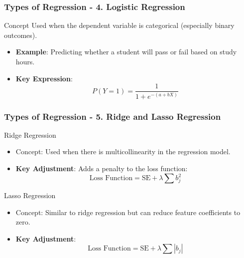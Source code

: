 \documentclass[aspectratio=169]{beamer}
\begin{document}
\begin{frame}[fragile]
    \frametitle{Types of Regression - 4. Logistic Regression}
    \begin{block}{Concept}
        Used when the dependent variable is categorical (especially binary outcomes).
    \end{block}
    \begin{itemize}
        \item \textbf{Example}: Predicting whether a student will pass or fail based on study hours.
        \item \textbf{Key Expression}:
        \begin{equation}
            P(Y=1) = \frac{1}{1 + e^{-(a + bX)}}
        \end{equation}
    \end{itemize}
\end{frame}

\begin{frame}[fragile]
    \frametitle{Types of Regression - 5. Ridge and Lasso Regression}
    \begin{block}{Ridge Regression}
        \begin{itemize}
            \item Concept: Used when there is multicollinearity in the regression model.
            \item \textbf{Key Adjustment}: Adds a penalty to the loss function: 
            \begin{equation}
                \text{Loss Function} = \text{SE} + \lambda \sum b_j^2
            \end{equation}
        \end{itemize}
    \end{block}
    \begin{block}{Lasso Regression}
        \begin{itemize}
            \item Concept: Similar to ridge regression but can reduce feature coefficients to zero.
            \item \textbf{Key Adjustment}: 
            \begin{equation}
                \text{Loss Function} = \text{SE} + \lambda \sum |b_j|
            \end{equation}
        \end{itemize}
    \end{block}
\end{frame}
\end{document}

